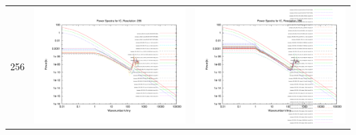\documentclass[a4paper,11pt,fleqn,oneside]{book}
\begin{document}
\begin{itemize}
\begin{table}
\begin{tabular}{l|c|c}
 256 & \includegraphics[scale=0.2]{analysis/powerspectra/IC_powspec_combined_256_h70.pdf} & \includegraphics[scale=0.2]{analysis/powerspectra/IC_powspec_combined_256_h100.pdf} \\

\end{tabular}
\end{table}
\end{itemize}
\end{document}
